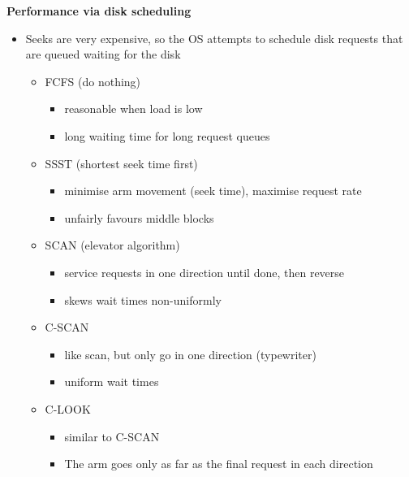 \documentclass[11pt,a4paper]{article}
\begin{document}
\textbf{Performance via disk scheduling}
\begin{itemize}
    \item Seeks are very expensive, so the OS attempts to schedule disk requests that are
        queued waiting for the disk
        \begin{itemize}
            \item FCFS (do nothing)
                \begin{itemize}
                    \item reasonable when load is low
                    \item long waiting time for long request queues
                \end{itemize}
            \item SSST (shortest seek time first)
                \begin{itemize}
                    \item minimise arm movement (seek time), maximise request rate
                    \item unfairly favours middle blocks
                \end{itemize}
            \item SCAN (elevator algorithm)
                \begin{itemize}
                    \item service requests in one direction until done, then reverse
                    \item skews wait times non-uniformly
                \end{itemize}
            \item C-SCAN
                \begin{itemize}
                    \item like scan, but only go in one direction (typewriter)
                    \item uniform wait times
                \end{itemize}
            \item C-LOOK
                \begin{itemize}
                    \item similar to C-SCAN
                    \item The arm goes only as far as the final request in each direction
                \end{itemize}
        \end{itemize}
\end{itemize}
\end{document}
